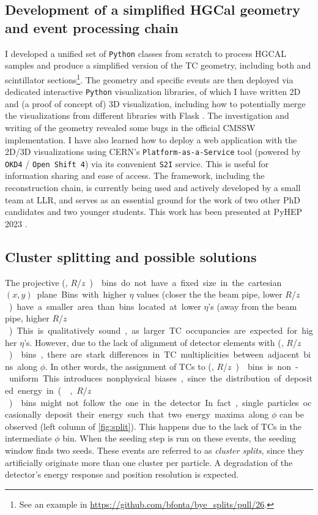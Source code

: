 \documentclass[11pt]{article}
\newcommand{\azimuth}{$\phi$}
\newcommand{\coordsa}{(\si{\azi}, \si{\rz})}
\newcommand{\rapidity}{$\eta$}
\newcommand{\rz}{$R$/$z$}
\begin{document}
\subsection{Development of a simplified HGCal geometry and event processing chain}
\label{sec:orgd7860c8}
\label{sec:event_geom_developments}

I developed a unified set of \texttt{Python} classes from scratch to process HGCAL samples and produce a simplified version of the TC geometry, including both  and scintillator sections\footnote{See an example in \url{https://github.com/bfonta/bye_splits/pull/26}.}.
The geometry and specific events are then deployed via dedicated interactive \texttt{Python} visualization libraries, of which I have written 2D and (a proof of concept of) 3D visualization, including how to potentially merge the visualizations from different libraries with Flask \cite{flask}.
The investigation and writing of the geometry revealed some bugs in the official \ac{CMSSW} \cite{cmssw} implementation.
I have also learned how to deploy a web application with the 2D/3D visualizations using CERN's \texttt{Platform-as-a-Service} tool (powered by \texttt{OKD4} / \texttt{Open Shift 4}) via its convenient \texttt{S2I} service.
This is useful for information sharing and ease of access.
The framework, including the reconstruction chain, is currently being used and actively developed by a small team at LLR, and serves as an essential ground for the work of two other PhD candidates and two younger students.
This work has been presented at PyHEP 2023 \cite{bruno_pyhep23}.
\subsection{Cluster splitting and possible solutions}
\label{sec:org4ce7625}
\label{sec:cluster_splitting}

The projective \coordsa{} bins do not have a fixed size in the cartesian \((x,y)\) plane.
Bins with higher \rapidity{} values (closer the the beam pipe, lower \si{\rz}) have a smaller area than bins located at lower \rapidity{}'s (away from the beam pipe, higher \si{\rz}).
This is qualitatively sound, as larger \ac{TC} occupancies are expected for higher \rapidity{}'s.
However, due to the lack of alignment of detector elements with \coordsa{} bins, there are stark differences in \ac{TC} multiplicities between adjacent bins along \azimuth{}.
In other words, the assignment of \acp{TC} to \coordsa{} bins is non-uniform.
This introduces nonphysical biases, since the distribution of deposited energy in \coordsa{} bins might not follow the one in the detector.
In fact, single particles occasionally deposit their energy such that two energy maxima along \azimuth{} can be observed (left column of \cref{fig:split}).
This happens due to the lack of \acp{TC} in the intermediate \azimuth{} bin.
When the seeding step is run on these events, the seeding window finds two seeds.
These events are referred to as \emph{cluster splits}, since they artificially originate more than one cluster per particle.
A degradation of the detector's energy response and position resolution is expected.
\end{document}
